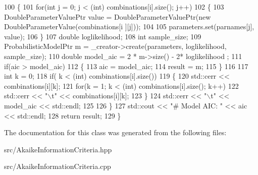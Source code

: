 \begin{DoxyCode}
100       \{
101         \textcolor{keywordflow}{for}(\textcolor{keywordtype}{int} j = 0; j < (int) combinations[i].size(); j++)
102           \{
103             DoubleParameterValuePtr value = DoubleParameterValuePtr(\textcolor{keyword}{new} DoubleParameterValue(combinations[i
      ][j]));
104 
105             parameters.set(parnames[j], value);
106           \}
107         \textcolor{keywordtype}{double} loglikelihood;
108         \textcolor{keywordtype}{int} sample\_size;
109         ProbabilisticModelPtr m = \_creator->create(parameters, loglikelihood, sample\_size);
110         \textcolor{keywordtype}{double} model\_aic = 2 * m->size()  - 2* loglikelihood ;
111         \textcolor{keywordflow}{if}(aic > model\_aic)
112           \{
113             aic = model\_aic;
114             result = m;
115           \}
116 
117         \textcolor{keywordtype}{int} k = 0;
118         \textcolor{keywordflow}{if}( k < (\textcolor{keywordtype}{int}) combinations[i].size())
119           \{
120             std::cerr << combinations[i][k];
121             \textcolor{keywordflow}{for}(k = 1; k < (int) combinations[i].size(); k++)
122               std::cerr << \textcolor{stringliteral}{"\(\backslash\)t"} << combinations[i][k];
123           \}
124         std::cerr << \textcolor{stringliteral}{"\(\backslash\)t"} << model\_aic  << std::endl;
125 
126       \}
127     std::cout << \textcolor{stringliteral}{"# Model AIC: "} << aic  << std::endl;
128     \textcolor{keywordflow}{return} result;
129   \}
\end{DoxyCode}


The documentation for this class was generated from the following files\+:\begin{DoxyCompactItemize}
\item 
src/Akaike\+Information\+Criteria.\+hpp\item 
src/Akaike\+Information\+Criteria.\+cpp\end{DoxyCompactItemize}
